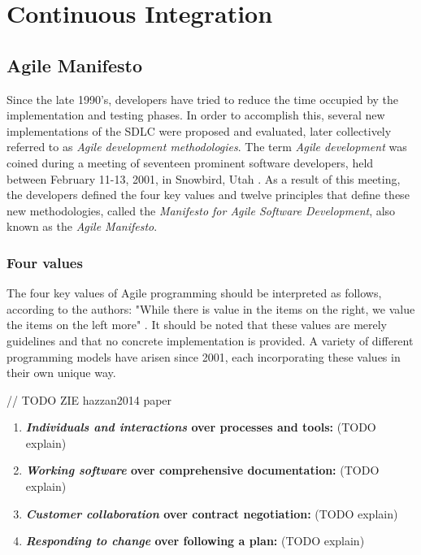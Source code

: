 \section{Continuous Integration}
\subsection{Agile Manifesto}
Since the late 1990's, developers have tried to reduce the time occupied by the implementation and testing phases. In order to accomplish this, several new implementations of the SDLC were proposed and evaluated, later collectively referred to as \emph{Agile development methodologies}. The term \emph{Agile development} was coined during a meeting of seventeen prominent software developers, held between February 11-13, 2001, in Snowbird, Utah \cite{jimhighsmith2001}. As a result of this meeting, the developers defined the four key values and twelve principles that define these new methodologies, called the \emph{Manifesto for Agile Software Development}, also known as the \emph{Agile Manifesto}.

\subsubsection{Four values}

The four key values of Agile programming should be interpreted as follows, according to the authors: "While there is value in the items on the right, we value the items on the left more" \cite{beck2001agile}. It should be noted that these values are merely guidelines and that no concrete implementation is provided. A variety of different programming models have arisen since 2001, each incorporating these values in their own unique way.

// TODO ZIE hazzan2014 paper

\begin{enumerate}
	\item \textbf{\emph{Individuals and interactions} over processes and tools:} (TODO explain)
	\item \textbf{\emph{Working software} over comprehensive documentation:} (TODO explain)
	\item \textbf{\emph{Customer collaboration} over contract negotiation:} (TODO explain)
	\item \textbf{\emph{Responding to change} over following a plan:} (TODO explain)
\end{enumerate}

